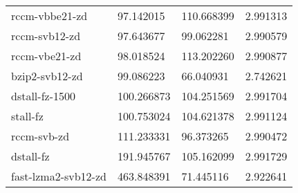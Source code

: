 \begin{table}
\begin{tabular}{|l|l|l|l|}
      rccm-vbbe21-zd   &   97.142015    &   110.668399  & 2.991313\\
       rccm-svb12-zd   &   97.643677    &    99.062281  & 2.990579\\
       rccm-vbe21-zd   &   98.018524    &   113.202260  & 2.990877\\
      bzip2-svb12-zd   &   99.086223    &    66.040931  & 2.742621\\
      dstall-fz-1500   &  100.266873    &   104.251569  & 2.991704\\
            stall-fz   &  100.753024    &   104.621378  & 2.991124\\
         rccm-svb-zd   &  111.233331    &    96.373265  & 2.990472\\
           dstall-fz   &  191.945767    &   105.162099  & 2.991729\\
 fast-lzma2-svb12-zd   &  463.848391    &    71.445116  & 2.922641\\
	\hline
    \end{tabular}
\end{table}
